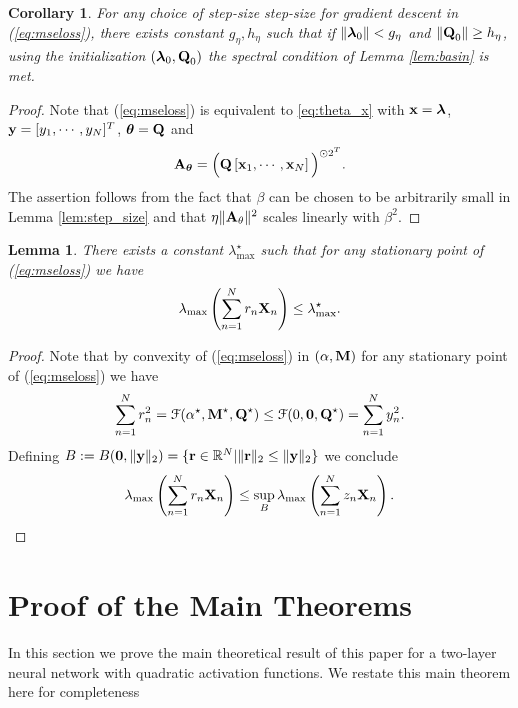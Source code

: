 \documentclass[11pt]{article}
\theoremstyle{plain}
\newtheorem{lemma}{Lemma}
\newtheorem{corollary}{Corollary}
\def\R{\mathbb{R}}
\theoremstyle{plain}
\numberwithin{equation}{section}
\numberwithin{lemma}{section}
\numberwithin{theorem}{section}
\numberwithin{corollary}{section}
\numberwithin{observation}{section}
\numberwithin{definition}{section}
\numberwithin{example}{section}
\begin{document}
\begin{corollary} \label{cor:step_size}
For any choice of step-size step-size for gradient descent in (\ref{eq:mseloss}), there exists constant $g_{\eta}, h_{\eta}$ such that if $\|\V{\lambda}_0\| < g_{\eta}$ and $\|\Mx{Q}_0\| \geq h_{\eta}$, using the initialization $(\V{\lambda}_0 , \Mx{Q}_0)$ the spectral condition of Lemma \ref{lem:basin} is met.
\end{corollary}
\begin{proof}
Note that (\ref{eq:mseloss}) is equivalent to \ref{eq:theta_x} with $\V{x} = \V{\lambda}$, $\V{y}= [y_1,\cdots,y_N]^T$, $\V{\theta}= \Mx{Q}$ and
\[
\Mx{A}_{\V{\theta}} = \Big(\Mx{Q} \left[\V{x}_1,\cdots,\V{x}_N \right] \Big)^{\odot 2^T}.
\]
The assertion follows from the fact that $\beta$ can be chosen to be arbitrarily small in Lemma \ref{lem:step_size} and that
$\eta \| \Mx{A}_{\theta}\|^2$ scales linearly with $\beta^2$.
\end{proof}

\begin{lemma}\label{lem:bounded_eig} There exists a constant $\lambda^{\star}_{\max}$ such that for any stationary point of (\ref{eq:mseloss}) we have
\[
\lambda_{\max}\left(\sum_{n=1}^N{r_n \Mx{X}_n}\right) \leq \lambda_{\max}^\star.\]
\end{lemma}
\begin{proof}
Note that by convexity of (\ref{eq:mseloss}) in $(\alpha,\Mx{M})$ for any stationary point of (\ref{eq:mseloss}) we have 
\[ 
\sum_{n=1}^N r_n^2 = \mathcal{F}(\alpha^\star, \Mx{M}^\star, \Mx{Q}^\star) \leq \mathcal{F}(0, \Mx{0}, \Mx{Q}^\star) = \sum_{n=1}^N y_n^2.
\]
Defining $B : = B(\Mx{0},\|\V{y}\|_2) = \{\V{r} \in \R^N| \|\V{r}\|_2 \leq \|\V{y}\|_2\}$ we conclude
\[
\lambda_{\max}\left(\sum_{n=1}^N{r_n \Mx{X}_n}\right) \leq \sup_{B} \lambda_{\max}\left(\sum_{n=1}^N{z_n \Mx{X}_n}\right).\]
\end{proof}







 \section{Proof of the Main Theorems}
\renewcommand{\theequation}{\Alph{section}.\arabic{equation}}
\renewcommand{\thefigure}{\Alph{section}.\arabic{figure}}





In this section we prove the main theoretical result of this paper for a two-layer neural network with quadratic activation functions. We restate this main theorem here for completeness
\end{document}
